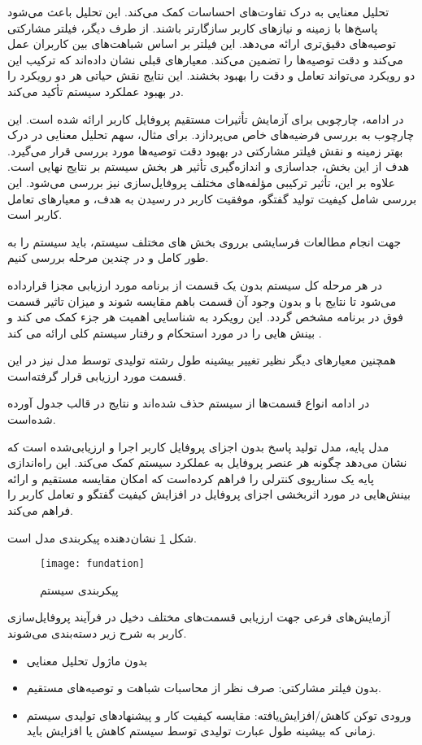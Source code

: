 تحلیل معنایی به درک تفاوت‌های احساسات کمک می‌کند. این تحلیل باعث می‌شود پاسخ‌ها با زمینه و نیازهای کاربر سازگارتر باشند. از طرف دیگر، فیلتر مشارکتی توصیه‌های دقیق‌تری ارائه می‌دهد. این فیلتر بر اساس شباهت‌های بین کاربران عمل می‌کند و دقت توصیه‌ها را تضمین می‌کند.
معیارهای قبلی نشان داده‌اند که ترکیب این دو رویکرد می‌تواند تعامل و دقت را بهبود بخشند. این نتایج نقش حیاتی هر دو رویکرد را در بهبود عملکرد سیستم تأکید می‌کند.

در ادامه، چارچوبی برای آزمایش تأثیرات مستقیم پروفایل کاربر ارائه شده است. این چارچوب به بررسی فرضیه‌های خاص می‌پردازد. برای مثال، سهم تحلیل معنایی در درک بهتر زمینه و نقش فیلتر مشارکتی در بهبود دقت توصیه‌ها مورد بررسی قرار می‌گیرد.
هدف از این بخش، جداسازی و اندازه‌گیری تأثیر هر بخش سیستم بر نتایج نهایی است. علاوه بر این، تأثیر ترکیبی مؤلفه‌های مختلف پروفایل‌سازی نیز بررسی می‌شود. این بررسی شامل کیفیت تولید گفتگو، موفقیت کاربر در رسیدن به هدف، و معیارهای تعامل کاربر است.

جهت انجام مطالعات فرسایشی%
 برروی بخش های مختلف سیستم، باید سیستم را به طور کامل و در چندین مرحله بررسی کنیم.

در هر مرحله کل سیستم بدون یک قسمت از برنامه مورد ارزیابی مجزا قرارداده می‌شود تا نتایج با و بدون وجود آن قسمت باهم مقایسه شوند و میزان تاثیر قسمت فوق در برنامه مشخص گردد. این رویکرد به شناسایی اهمیت هر جزء کمک می کند و بینش هایی را در مورد استحکام و رفتار سیستم کلی ارائه می کند %
\cite{na2024scalable}
.

همچنین معیارهای دیگر نظیر تغییر بیشینه طول رشته تولیدی توسط مدل نیز در این قسمت مورد ارزیابی قرار گرفته‌است.

در ادامه انواع قسمت‌ها از سیستم حذف شده‌اند و نتایج در قالب جدول آورده شده‌است.


مدل پایه، مدل تولید پاسخ بدون اجزای پروفایل کاربر اجرا و ارزیابی‌شده است که نشان می‌د‌هد چگونه هر عنصر پروفایل به عملکرد سیستم کمک می‌کند. این راه‌اندازی پایه یک سناریوی کنترلی را فراهم کرده‌است که امکان مقایسه مستقیم و ارائه بینش‌هایی در مورد اثربخشی اجزای پروفایل در افزایش کیفیت گفتگو و تعامل کاربر را فراهم می‌کند.

شکل%
\ref{fig:fundation}
نشان دهنده پیکربندی مدل است.


\begin{figure}[ht]
	\centerline{\texttt{[image: fundation]}}
	\caption{پیکربندی سیستم}
	\label{fig:fundation}
\end{figure}

آزمایش‌های فرعی جهت ارزیابی قسمت‌های مختلف دخیل در فرآیند پروفایل‌سازی کاربر به شرح زیر دسته‌بندی می‌شوند.
\begin{itemize}
\item
بدون ماژول تحلیل معنایی
\item
بدون فیلتر مشارکتی: صرف نظر از محاسبات شباهت و توصیه‌های مستقیم.
\item
ورودی توکن کاهش/افزایش‌یافته: مقایسه کیفیت کار و پیشنهادهای تولیدی سیستم زمانی که بیشینه طول عبارت تولیدی توسط سیستم کاهش یا افزایش باید.
\end{itemize}

